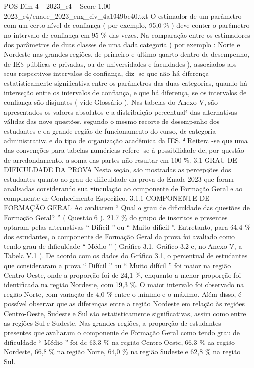 \begin{textsample}{POS Dim 4 – 2023\_c4 – Score 1.00 – 2023\_c4/enade\_2023\_eng\_civ\_4a1049be40.txt}
O estimador de um parâmetro com um certo nível de confiança ( por exemplo, 95,0 \% ) deve conter o parâmetro no intervalo de confiança em 95 \% das vezes.
Na comparação entre os estimadores dos parâmetros de duas classes de uma dada categoria ( por exemplo : Norte e Nordeste nas grandes regiões, de primeiro e último quarto dentro de desempenho, de IES públicas e privadas, ou de universidades e faculdades ), associados aos seus respectivos intervalos de confiança, diz -se que não há diferença estatisticamente significativa entre os parâmetros das duas categorias, quando há interseção entre os intervalos de confiança, e que há diferença, se os intervalos de confiança são disjuntos ( vide Glossário ).
Nas tabelas do Anexo V, são apresentados os valores absolutos e a distribuição percentual⁴ das alternativas válidas das nove questões, segundo o mesmo recorte de desempenho dos estudantes e da grande região de funcionamento do curso, de categoria administrativa e do tipo de organização acadêmica da IES. ⁴ Reitera -se que uma das convenções para tabelas numéricas refere -se à possibilidade de, por questão de arredondamento, a soma das partes não resultar em 100 \%. 3.1 GRAU DE DIFICULDADE DA PROVA Nesta seção, são mostradas as percepções dos estudantes quanto ao grau de dificuldade da prova do Enade 2023 que foram analisadas considerando sua vinculação ao componente de Formação Geral e ao componente de Conhecimento Específico. 3.1.1 COMPONENTE DE FORMAÇÃO GERAL Ao avaliarem “ Qual o grau de dificuldade das questões de Formação Geral? ” ( Questão 6 ), 21,7 \% do grupo de inscritos e presentes optaram pelas alternativas “ Difícil ” ou “ Muito difícil ”.
Entretanto, para 64,4 \% dos estudantes, o componente de Formação Geral da prova foi avaliado como tendo grau de dificuldade “ Médio ” ( Gráfico 3.1, Gráfico 3.2 e, no Anexo V, a Tabela V.1 ).
De acordo com os dados do Gráfico 3.1, o percentual de estudantes que consideraram a prova “ Difícil ” ou “ Muito difícil ” foi maior na região Centro-Oeste, onde a proporção foi de 24,1 \%, enquanto a menor proporção foi identificada na região Nordeste, com 19,3 \%.
O maior intervalo foi observado na região Norte, com variação de 4,0 \% entre o mínimo e o máximo.
Além disso, é possível observar que as diferenças entre a região Nordeste em relação às regiões Centro-Oeste, Sudeste e Sul são estatisticamente significativas, assim como entre as regiões Sul e Sudeste.
Nas grandes regiões, a proporção de estudantes presentes que avaliaram o componente de Formação Geral como tendo grau de dificuldade “ Médio ” foi de 63,3 \% na região Centro-Oeste, 66,3 \% na região Nordeste, 66,8 \% na região Norte, 64,0 \% na região Sudeste e 62,8 \% na região Sul.

\end{textsample}
